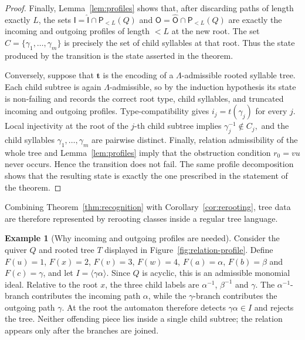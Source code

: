 \documentclass[11pt,a4paper]{amsart}
\theoremstyle{definition}
\newtheorem{example}[definition]{Example}
\theoremstyle{plain}
\theoremstyle{remark}
\numberwithin{equation}{section}
\begin{document}
\begin{proof}
Finally, Lemma~\ref{lem:profiles} shows that, after discarding paths of length exactly $L$, the sets $
\mathsf I=\widehat{\mathsf I}\cap\mathsf P_{<L}(Q)$ and $
\mathsf O=\widehat{\mathsf O}\cap\mathsf P_{<L}(Q) $ are exactly the incoming and outgoing profiles of length $<L$ at the new root. The set $C=\{\gamma_1,\ldots,\gamma_m\}$ is precisely the set of child syllables at that root. Thus the state produced by the transition is the state asserted in the theorem.

Conversely, suppose that $\mathbf t$ is the encoding of a $\Lambda$-admissible rooted syllable tree. Each child subtree is again $\Lambda$-admissible, so by the induction hypothesis its state is non-failing and records the correct root type, child syllables, and truncated incoming and outgoing profiles. Type-compatibility gives $i_j=t(\gamma_j)$ for every $j$. Local injectivity at the root of the $j$-th child subtree implies $\gamma_j^{-1}\notin C_j,$ and the child syllables $\gamma_1,\ldots,\gamma_m$ are pairwise distinct. Finally, relation admissibility of the whole tree and Lemma~\ref{lem:profiles} imply that the obstruction condition $r_0=vu$ never occurs. Hence the transition does not fail. The same profile decomposition shows that the resulting state is exactly the one prescribed in the statement of the theorem.
\end{proof}

Combining Theorem~\ref{thm:recognition} with Corollary~\ref{cor:rerooting}, tree data are therefore represented by rerooting classes inside a regular tree language.

\begin{example}[Why incoming and outgoing profiles are needed]\label{ex:relation-profile}
Consider the quiver $Q$ and rooted tree $T$ displayed in Figure~\ref{fig:relation-profile}. Define $F(u)=1$, $F(x)=2$, $F(v)=3$, $F(w)=4$, $F(a)=\alpha$, $F(b)=\beta$ and $F(c)=\gamma$, and let $I=\langle\gamma\alpha\rangle$. Since $Q$ is acyclic, this is an admissible monomial ideal. Relative to the root $x$, the three child labels are $\alpha^{-1}$, $\beta^{-1}$ and $\gamma$. The $\alpha^{-1}$-branch contributes the incoming path $\alpha$, while the $\gamma$-branch contributes the outgoing path $\gamma$. At the root the automaton therefore detects $\gamma\alpha\in I$ and rejects the tree. Neither offending piece lies inside a single child subtree; the relation appears only after the branches are joined.
\end{example}
\end{document}
